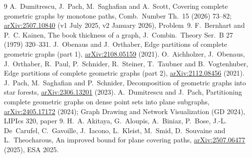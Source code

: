 \documentclass[11pt,a4paper]{article}
\theoremstyle{plain}
\theoremstyle{definition}
\theoremstyle{remark}
\begin{document}
\begin{thebibliography}{9}
\small
\setlength{\itemsep}{2pt}
 A.~Dumitrescu, J.~Pach, M.~Saghafian and A.~Scott, Covering complete geometric graphs by monotone paths, Comb.\ Number Th.\ 15 (2026) 73--82; \href{https://arxiv.org/abs/2507.10840}{arXiv:2507.10840} (v1 July 2025, v2 January 2026), Problem~9.
 F.~Bernhart and P.~C. Kainen, The book thickness of a graph, J.\ Combin.\ Theory Ser.\ B 27 (1979) 320--331.
 J.~Obenaus and J.~Orthaber, Edge partitions of complete geometric graphs (part 1), \href{https://arxiv.org/abs/2108.05159}{arXiv:2108.05159} (2021).
 O.~Aichholzer, J.~Obenaus, J.~Orthaber, R.~Paul, P.~Schnider, R.~Steiner, T.~Taubner and B.~Vogtenhuber, Edge partitions of complete geometric graphs (part 2), \href{https://arxiv.org/abs/2112.08456}{arXiv:2112.08456} (2021).
 J.~Pach, M.~Saghafian and P.~Schnider, Decomposition of geometric graphs into star forests, \href{https://arxiv.org/abs/2306.13201}{arXiv:2306.13201} (2023).
 A.~Dumitrescu and J.~Pach, Partitioning complete geometric graphs on dense point sets into plane subgraphs, \href{https://arxiv.org/abs/2405.17172}{arXiv:2405.17172} (2024); Graph Drawing and Network Visualization (GD 2024), LIPIcs 320, paper 9.
 H.~A. Akitaya, G.~Aloupis, A.~Biniaz, P.~Bose, J.-L. De~Carufel, C.~Gavoille, J.~Iacono, L.~Kleist, M.~Smid, D.~Souvaine and L.~Theocharous, An improved bound for plane covering paths, \href{https://arxiv.org/abs/2507.06477}{arXiv:2507.06477} (2025), ESA 2025.
\end{thebibliography}
\end{document}

